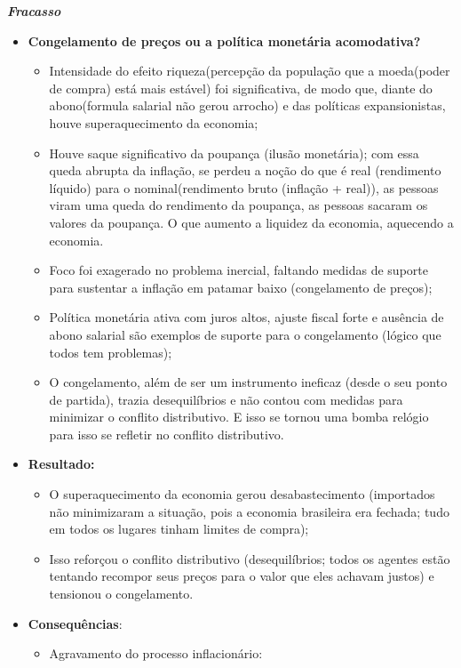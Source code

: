 \documentclass[a4paper,12pt]{article}[abntex2]
\begin{document}
\textbf{\textit{Fracasso}}\begin{itemize}
    \item \textbf{Congelamento de preços ou a política monetária acomodativa?} \begin{itemize}
        \item Intensidade do efeito riqueza(percepção da população que a moeda(poder de compra) está mais estável) foi significativa, de modo que, diante do abono(formula salarial não gerou arrocho) e das políticas expansionistas, houve superaquecimento da economia;
        \item Houve saque significativo da poupança (ilusão monetária); com essa queda abrupta da inflação, se perdeu a noção do que é real (rendimento líquido) para o nominal(rendimento bruto (inflação + real)), as pessoas viram uma queda do rendimento da poupança, as pessoas sacaram os valores da poupança. O que aumento a liquidez da economia, aquecendo a economia.
        \item Foco foi exagerado no problema inercial, faltando medidas de suporte para sustentar a inflação em patamar baixo (congelamento de preços);
        \item Política monetária ativa com juros altos, ajuste fiscal forte e ausência de abono salarial são exemplos de suporte para o congelamento (lógico que todos tem problemas);
        \item O congelamento, além de ser um instrumento ineficaz (desde o seu ponto de partida), trazia desequilíbrios e não contou com medidas para minimizar o conflito distributivo. E isso se tornou uma bomba relógio para isso se refletir no conflito distributivo.
    \end{itemize}
    \item \textbf{Resultado:} \begin{itemize}
        \item O superaquecimento da economia gerou desabastecimento (importados não minimizaram a situação, pois a economia brasileira era fechada; tudo em todos os lugares tinham limites de compra);
        \item Isso reforçou o conflito distributivo (desequilíbrios; todos os agentes estão tentando recompor seus preços para o valor que eles achavam justos) e tensionou o congelamento.
    \end{itemize}
    \item \textbf{Consequências}:\begin{itemize}
    \item Agravamento do processo inflacionário:\begin{itemize}

\end{itemize}
\end{itemize}
\end{itemize}
\end{document}
